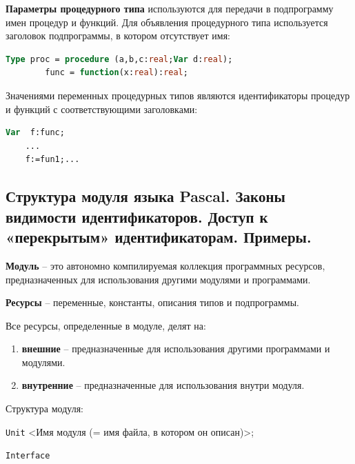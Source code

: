 {\bf{Параметры процедурного типа}} используются для передачи в подпрограмму имен процедур и функций. Для объявления процедурного типа используется заголовок подпрограммы, в котором отсутствует имя:

\begin{lstlisting}[language = pascal]
	Type proc = procedure (a,b,c:real;Var d:real);
        func = function(x:real):real;
\end{lstlisting}

Значениями переменных процедурных типов являются идентификаторы процедур и функций с соответствующими заголовками:

\begin{lstlisting}[language = pascal]
	Var  f:func;
	...
	f:=fun1;...
\end{lstlisting}




\newpage\subsection{Структура модуля языка Pascal. Законы видимости идентификаторов. Доступ к «перекрытым» идентификаторам. Примеры. }


\begin{myquote}
            
\end{myquote}

{\bf Модуль} – это автономно компилируемая коллекция программных ресурсов, предназначенных для использования другими модулями и программами.

\noindent
{\bf Ресурсы} – переменные, константы, описания типов и подпрограммы.

\noindent
Все ресурсы, определенные в модуле, делят на:

\begin{enumerate}
\item {\bf внешние} – предназначенные для использования другими программами и модулями.
\item {\bf внутренние} – предназначенные для использования внутри модуля.
\end{enumerate}

\noindent
Структура модуля:

{\tt Unit} <Имя модуля (= имя файла, в котором он описан)>;

{\tt Interface }

